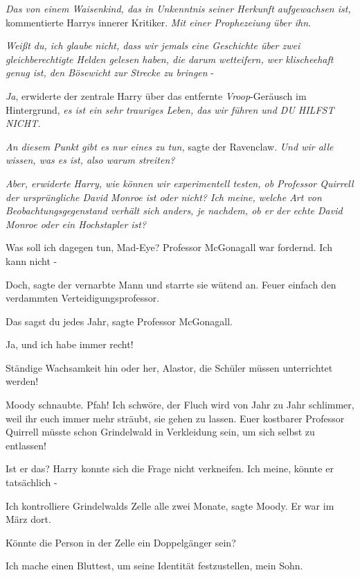 \emph{Das von einem Waisenkind, das in Unkenntnis seiner Herkunft aufgewachsen
ist,} kommentierte Harrys innerer Kritiker. \emph{Mit einer Prophezeiung über
ihn.}

\emph{Weißt du, ich glaube nicht, dass wir jemals eine Geschichte über zwei
gleichberechtigte Helden gelesen haben, die darum wetteifern, wer klischeehaft
genug ist, den Bösewicht zur Strecke zu bringen }-

\emph{Ja}, erwiderte der zentrale Harry über das entfernte \emph{Vroop}-Geräusch
im Hintergrund, \emph{es ist ein sehr trauriges Leben, das wir führen und DU
HILFST NICHT.}

\emph{An diesem Punkt gibt es nur eines zu tun,} sagte der Ravenclaw. \emph{Und
wir alle wissen, was es ist, also warum streiten?}

\emph{Aber, erwiderte Harry, wie können wir experimentell testen, ob Professor Quirrell der ursprüngliche David Monroe ist oder nicht? Ich meine, welche Art von Beobachtungsgegenstand verhält sich anders, je nachdem, ob er der echte David Monroe oder ein Hochstapler ist?}

\glqq Was soll ich dagegen tun, Mad-Eye?\grqq{} Professor McGonagall war
fordernd. \glqq Ich kann nicht -\grqq{}

\glqq Doch\grqq{}, sagte der vernarbte Mann und starrte sie wütend an. \glqq
Feuer einfach den verdammten Verteidigungsprofessor.\grqq{}

\glqq Das sagst du jedes Jahr\grqq{}, sagte Professor McGonagall.

\glqq Ja, und ich habe immer recht!\grqq{}

\glqq Ständige Wachsamkeit hin oder her, Alastor, die Schüler müssen
unterrichtet werden!\grqq{}

Moody schnaubte. \glqq Pfah! Ich schwöre, der Fluch wird von Jahr zu Jahr
schlimmer, weil ihr euch immer mehr sträubt, sie gehen zu lassen. Euer kostbarer
Professor Quirrell müsste schon Grindelwald in Verkleidung sein, um sich selbst
zu entlassen!\grqq{}

\glqq Ist er das?\grqq{} Harry konnte sich die Frage nicht verkneifen. \glqq Ich
meine, könnte er tatsächlich -\grqq{}

\glqq Ich kontrolliere Grindelwalds Zelle alle zwei Monate\grqq{}, sagte Moody.
\glqq Er war im März dort.\grqq{}

\glqq Könnte die Person in der Zelle ein Doppelgänger sein?\grqq{}

\glqq Ich mache einen Bluttest, um seine Identität festzustellen, mein
Sohn.\grqq{}

